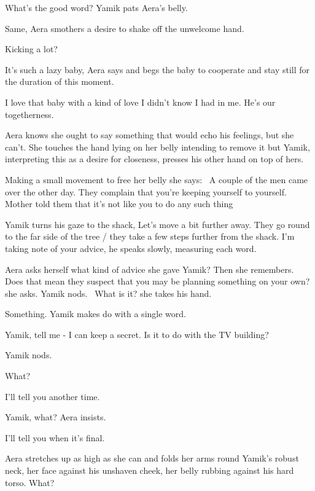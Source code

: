 \documentclass[12pt]{book}
\begin{document}
{\textquotedbl}What's the good word?{\textquotedbl} Yamik pats Aera's belly.

{\textquotedbl}Same,{\textquotedbl} Aera smothers a desire to shake off the unwelcome hand.

{\textquotedbl}Kicking a lot?{\textquotedbl}

{\textquotedbl}It's such a lazy baby,{\textquotedbl} Aera says and begs the baby to cooperate and stay still for the
duration of this moment.

{\textquotedbl}I love that baby with a kind of love I didn't know I had in me. He's our togetherness.{\textquotedbl}

Aera knows she ought to say something that would echo his feelings, but she can't. She touches the hand lying on her
belly intending to remove it but Yamik, interpreting this as a desire for closeness, presses his other hand on top of
hers. ~

Making a small movement to free her belly she says: \ {\textquotedbl}A couple of the men came over the other day. They
complain that you're keeping yourself to yourself. Mother told them that it's not like you to do any such
thing{\textquotedbl}

Yamik turns his gaze to the shack, {\textquotedbl}Let's move a bit further away.{\textquotedbl} They go round to the far
side of the tree / they take a few steps further from the shack. {\textquotedbl}I'm taking note of your
advice,{\textquotedbl} he speaks slowly, measuring each word.

Aera asks herself what kind of advice she gave Yamik? Then she remembers. {\textquotedbl}Does that mean they suspect
that you may be planning something on your own?{\textquotedbl} she asks. Yamik nods. \ {\textquotedbl}What is
it?{\textquotedbl} she takes his hand.

{\textquotedbl}Something.{\textquotedbl} Yamik makes do with a single word.

{\textquotedbl}Yamik, tell me - I can keep a secret. Is it to do with the TV building?{\textquotedbl}

Yamik nods.

{\textquotedbl}What?{\textquotedbl}

{\textquotedbl}I'll tell you another time.{\textquotedbl}

{\textquotedbl}Yamik, what?{\textquotedbl} Aera insists.

{\textquotedbl}I'll tell you when it's final.{\textquotedbl}

Aera stretches up as high as she can and folds her arms round Yamik's robust neck, her face against his unshaven cheek,
her belly rubbing against his hard torso. {\textquotedbl}What?{\textquotedbl}
\end{document}
